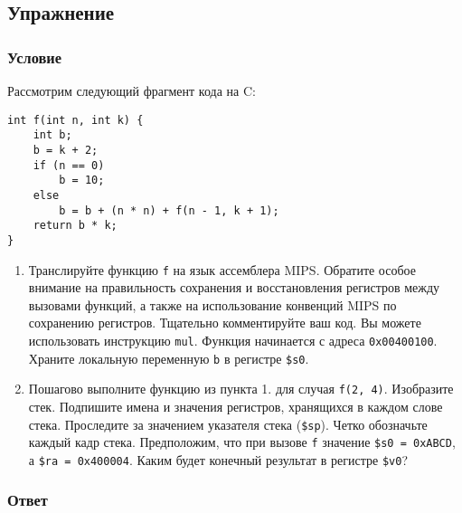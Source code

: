 \documentclass[12pt]{article}
\newenvironment{e}[1][dummy label]{
    \subsection{Упражнение}\label{#1}
    \subsubsection*{Условие}
    }{
    \subsubsection*{Ответ}
}
\begin{document}
    \newpage

    \begin{e}
        Рассмотрим следующий фрагмент кода на C:
        \begin{verbatim}
int f(int n, int k) {
    int b;
    b = k + 2;
    if (n == 0)
        b = 10;
    else
        b = b + (n * n) + f(n - 1, k + 1);
    return b * k;
}
        \end{verbatim}
        \begin{enumerate}
            \item Транслируйте функцию \texttt{f} на язык ассемблера MIPS. Обратите особое внимание на правильность сохранения и восстановления регистров между вызовами функций, а также на использование конвенций MIPS по сохранению регистров. Тщательно комментируйте ваш код. Вы можете использовать инструкцию \texttt{mul}. Функция начинается с адреса \texttt{0x00400100}. Храните локальную переменную \texttt{b} в регистре \texttt{\$s0}.
            \item Пошагово выполните функцию из пункта 1. для случая \texttt{f(2, 4)}. Изобразите стек. Подпишите имена и значения регистров, хранящихся в каждом слове стека. Проследите за значением указателя стека (\texttt{\$sp}). Четко обозначьте каждый кадр стека. Предположим, что при вызове \texttt{f} значение \texttt{\$s0 = 0xABCD}, а \texttt{\$ra = 0x400004}. Каким будет конечный результат в регистре \texttt{\$v0}?
        \end{enumerate}
    \end{e}
\end{document}
